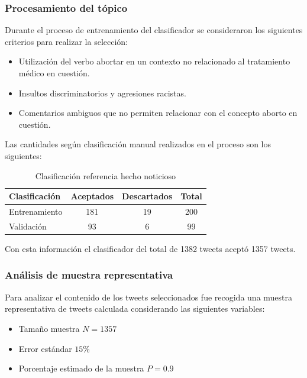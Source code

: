 \subsubsection{Procesamiento del tópico}

Durante el proceso de entrenamiento del clasificador se consideraron los siguientes criterios para realizar la selección:

\begin{itemize}
	\item Utilización del verbo abortar en un contexto no relacionado al tratamiento médico en cuestión.
	\item Insultos discriminatorios y agresiones racistas. 
	\item Comentarios ambiguos que no permiten relacionar con el concepto aborto en cuestión.
\end{itemize}

Las cantidades según clasificación manual realizados en el proceso son los siguientes:

\begin{table}[H]
	\centering
	\begin{tabular}{| l | c | c | c |}
		\hline
		Clasificación    & Aceptados & Descartados & Total \\ \hline
		Entrenamiento    & 181 & 19 & 200\\ \hline
		Validación		 & 93 & 6 & 99\\ \hline
	\end{tabular}
	\caption {Clasificación referencia hecho noticioso}
\end{table}

Con esta información el clasificador del total de 1382 tweets aceptó 1357 tweets. \\

\subsubsection{Análisis de muestra representativa}

Para analizar el contenido de los tweets seleccionados fue recogida una muestra representativa de tweets 	calculada considerando las siguientes variables:

\begin{itemize}
	\item Tamaño muestra $N = 1357$
	\item Error estándar $15\%$	
	\item Porcentaje estimado de la muestra $P = 0.9$
\end{itemize}

